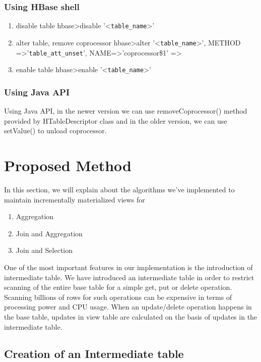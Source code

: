 \documentclass[11pt,a4paper,bibtotoc,idxtotoc,headsepline,footsepline,footexclude,BCOR12mm,DIV13]{scrbook}
\begin{document}
\subsubsection{Using HBase shell}
\begin{enumerate}
    \item disable table
    hbase\textgreater disable '\textless \texttt{table\_name}\textgreater'
    \item alter table, remove coprocessor
    hbase\textgreater alter '\textless \texttt{table\_name}\textgreater', \newline
    METHOD =\textgreater '\texttt{table\_att\_unset}', NAME=\textgreater 'coprocessor\$1' =\textgreater
    \item enable table
    hbase\textgreater enable '\textless \texttt{table\_name}\textgreater'
     
\end{enumerate}

\subsubsection{Using Java API}
Using Java API, in the newer version we can use removeCoprocessor() method provided by HTableDescriptor class and in the older version, we can use setValue() to unload coprocessor.

\section{Proposed Method}
In this section, we will explain about the algorithms we've implemented to maintain incrementally materialized views for 
\begin{enumerate}
    \item Aggregation
    \item Join and Aggregation
    \item Join and Selection
\end{enumerate}

One of the most important features in our implementation is the introduction of intermediate table. We have introduced an intermediate table in order to restrict scanning of the entire base table for a simple get, put or delete operation. Scanning billions of rows for such operations can be expensive in terms of processing power and CPU usage. When an update/delete operation happens in the base table, updates in view table are calculated on the basis of updates in the intermediate table.

\subsection{Creation of an Intermediate table}
\label{subsec:intermediatetable}
\end{document}
